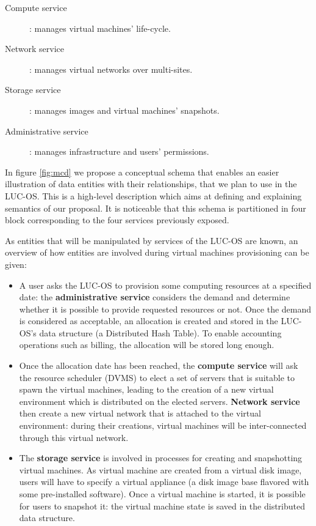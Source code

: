 \label{sub:sec:list_services}

\begin{description}

	\item [Compute service] : manages virtual machines' life-cycle.

	\item [Network service] : manages virtual networks over multi-sites.

	\item [Storage service] : manages images and virtual machines' snapshots.

	\item [Administrative service] : manages infrastructure and users' permissions.  

\end{description}

In figure \ref{fig:mcd} we propose a conceptual schema that enables an easier 
illustration of data entities with their relationships, that we plan to use in
the LUC-OS. This is a high-level description which aims at defining and 
explaining semantics of our proposal. It is noticeable that this schema is 
partitioned in four block corresponding to the four services previously exposed.

As entities that will be manipulated by services of the LUC-OS are known, an
overview of how entities are involved during virtual machines provisioning can
be given:

\begin{itemize}

	\item A user asks the LUC-OS to provision some computing resources at a 
	specified date:  the \textbf{administrative service} considers the demand 
	and determine  whether it is possible to provide requested resources or not. 
	Once the demand is considered as acceptable, an allocation is created and 
	stored in the  LUC-OS's data structure (a Distributed Hash Table). To enable
	accounting operations such as billing, the allocation will be stored long
	enough.

	\item Once the allocation date has been reached, the \textbf{compute
	service} will ask the resource scheduler (DVMS) to elect a 
	set of servers that is suitable to spawn the virtual machines, leading to 
	the creation of a new virtual environment which is distributed on the 
	elected servers. \textbf{Network service} then create a new virtual	network
	that is attached to the virtual	environment: during their creations, virtual
	machines will be inter-connected through this virtual network.

	\item The \textbf{storage service} is involved in processes for creating and 
	snapshotting virtual machines. As virtual machine are created from a virtual
	disk image, users will have to specify a virtual appliance (a disk image 
	base flavored with some pre-installed software). Once a virtual machine is 
	started, it is possible for users to snapshot it: the virtual machine state
	is saved in the distributed data structure.

\end{itemize}